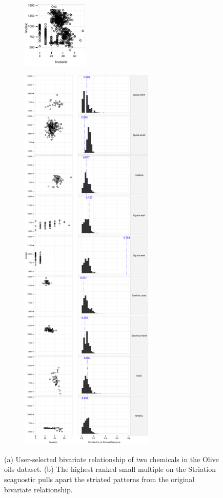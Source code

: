 \begin{figure}
 \centering 
	 \begin{subfigure}{1.25in}
		\includegraphics[width=1.25in]{images/linolenic-linoleic.pdf}
		  \caption{}
		 \label{fig:vrich_all}
	\end{subfigure}
	 \begin{subfigure}{2.5in}
		\includegraphics[width=2.5in]{images/15_2321946775352-region.pdf}
		  \caption{}
		 \label{fig:vrich_sm}
	\end{subfigure}
	  \caption{(a) User-selected bivariate relationship of two chemicals in the Olive oils dataset. (b) The highest ranked small multiple on the Striation scagnostic pulls apart the striated patterns from the original bivariate relationship. }
\end{figure}

